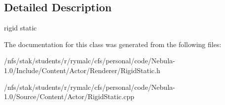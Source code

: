 \subsection{Detailed Description}
rigid static 

The documentation for this class was generated from the following files:\begin{DoxyCompactItemize}
\item 
/nfs/stak/students/r/rymalc/cfs/personal/code/Nebula-\/1.0/Include/Content/Actor/Renderer/RigidStatic.h\item 
/nfs/stak/students/r/rymalc/cfs/personal/code/Nebula-\/1.0/Source/Content/Actor/RigidStatic.cpp\end{DoxyCompactItemize}
